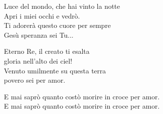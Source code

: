 
\strofa Luce del mondo, che hai vinto la notte\\
Apri i miei occhi e vedrò.\\
Ti adorerà questo cuore per sempre\\ 
Gesù speranza sei Tu...

\spazio

 

\spazio

\strofa Eterno Re, il creato ti esalta\\
gloria nell'alto dei ciel!\\
Venuto umilmente su questa terra\\
povero sei per amor.

\spazio


\spazio

E mai saprò quanto costò morire in croce per amor.\\
E mai saprò quanto costò morire in croce per amor.

\spazio

